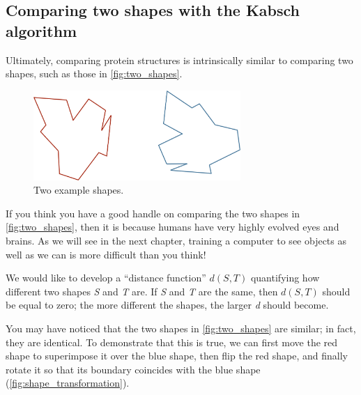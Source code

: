 \FloatBarrier
{}
\subsection{Comparing two shapes with the Kabsch algorithm}

Ultimately, comparing protein structures is intrinsically similar to comparing two shapes, such as those in \autoref{fig:two_shapes}.\\

\begin{qbox}\end{qbox}

\begin{figure}[h]
	\centering
	\mySfFamily
	\includegraphics[width = 0.7\textwidth]{../images/two_shapes.png}
	\caption{Two example shapes.}
	\label{fig:two_shapes}
\end{figure}

If you think you have a good handle on comparing the two shapes in \autoref{fig:two_shapes}, then it is because humans have very highly evolved eyes and brains. As we will see in the next chapter, training a computer to see objects as well as we can is more difficult than you think!

We would like to develop a ``distance function'' $d(S, T)$ quantifying how different two shapes \textit{S} and \textit{T} are. If \textit{S} and \textit{T} are the same, then $d(S, T)$ should be equal to zero; the more different the shapes, the larger \textit{d} should become.

You may have noticed that the two shapes in \autoref{fig:two_shapes} are similar; in fact, they are identical. To demonstrate that this is true, we can first move the red shape to superimpose it over the blue shape, then flip the red shape, and finally rotate it so that its boundary coincides with the blue shape (\autoref{fig:shape_transformation}).


